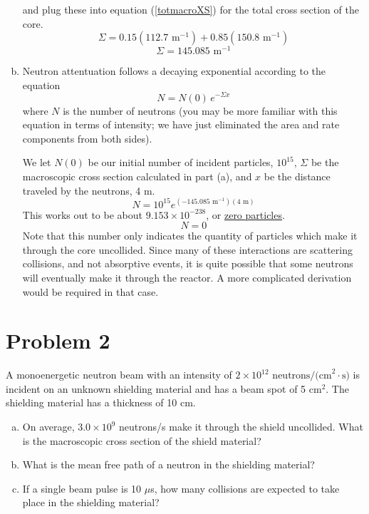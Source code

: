\documentclass{report}
\begin{document}
\begin{enumerate}[a)]
and plug these into equation (\ref{totmacroXS}) for the total cross section of the core.
$$ \Sigma = 0.15(112.7\text{ m}^{-1}) + 0.85(150.8\text{ m}^{-1})
 $$
$$\boxed{ \Sigma = 145.085\text{ m}^{-1} }$$

\item Neutron attentuation follows a decaying exponential according to the equation
$$ N = N(0) \, e^{-\Sigma x} $$
where $N$ is the number of neutrons (you may be more familiar with this equation in terms of intensity; we have just eliminated the area and rate components from both sides).

We let $N(0)$ be our initial number of incident particles, $10^{15}$, $\Sigma$ be the macroscopic cross section calculated in part (a), and $x$ be the distance traveled by the neutrons, 4 m.  
$$ N = 10^{15} e^{(-145.085\text{ m}^{-1})(4\text{ m})} $$
This works out to be about $9.153\times10^{-238}$, or \underline{zero particles}.
$$ N = 0 $$
Note that this number only indicates the quantity of particles which make it through the core uncollided. Since many of these interactions are scattering collisions, and not absorptive events, it is quite possible that some neutrons will eventually make it through the reactor. A more complicated derivation would be required in that case.
\end{enumerate}



\newpage
\section*{Problem 2}

A monoenergetic neutron beam with an intensity of $2 \times 10^{12}\text{ neutrons/(cm}^2{\cdot}\text{s)}$ is incident on an unknown shielding material and has a beam spot of 5 cm$^2$. The shielding material has a thickness of 10 cm.
\begin{enumerate}[a)]
\item On average, $3.0\times10^9$ neutrons/s make it through the shield uncollided. What is the macroscopic cross section of the shield material?
\item What is the mean free path of a neutron in the shielding material?
\item If a single beam pulse is 10 $\mu$s, how many collisions are expected to take place in the shielding material?
\end{enumerate}
\end{document}
